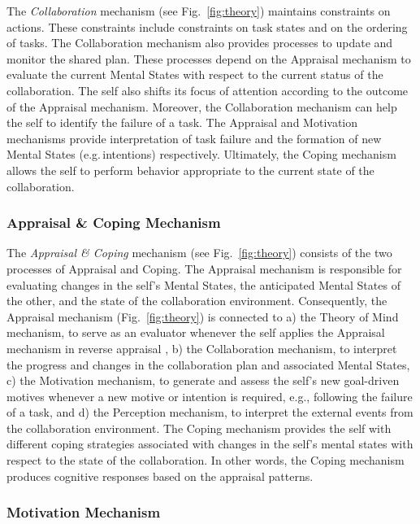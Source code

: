 The \textit{Collaboration} mechanism (see Fig.~\ref{fig:theory}) maintains
constraints on actions. These constraints include constraints on task states and
on the ordering of tasks. The Collaboration mechanism also provides processes to
update and monitor the shared plan. These processes depend on the Appraisal
mechanism to evaluate the current Mental States with respect to the current
status of the collaboration. The self also shifts its focus of attention
according to the outcome of the Appraisal mechanism. Moreover, the Collaboration
mechanism can help the self to identify the failure of a task. The Appraisal and
Motivation mechanisms provide interpretation of task failure and the formation
of new Mental States (e.g.\,intentions) respectively. Ultimately, the Coping
mechanism allows the self to perform behavior appropriate to the current state
of the collaboration.

\subsubsection{Appraisal \& Coping Mechanism}
\label{sec:appraisal-coping-mech}

The \textit{Appraisal \& Coping} mechanism (see Fig.~\ref{fig:theory}) consists
of the two processes of Appraisal and Coping. The Appraisal mechanism is
responsible for evaluating changes in the self's Mental States, the anticipated
Mental States of the other, and the state of the collaboration environment.
Consequently, the Appraisal mechanism (Fig.~\ref{fig:theory}) is connected to a)
the Theory of Mind mechanism, to serve as an evaluator whenever the self applies
the Appraisal mechanism in reverse appraisal \cite{gratch:reverse-appraisal}, b)
the Collaboration mechanism, to interpret the progress and changes in the
collaboration plan and associated Mental States, c) the Motivation mechanism, to
generate and assess the self's new goal-driven motives whenever a new motive or
intention is required, e.g., following the failure of a task, and d) the
Perception mechanism, to interpret the external events from the collaboration
environment. The Coping mechanism provides the self with different coping
strategies associated with changes in the self's mental states with respect to
the state of the collaboration. In other words, the Coping mechanism produces
cognitive responses based on the appraisal patterns.

\subsubsection{Motivation Mechanism}
\label{sec:motivation-mech}

